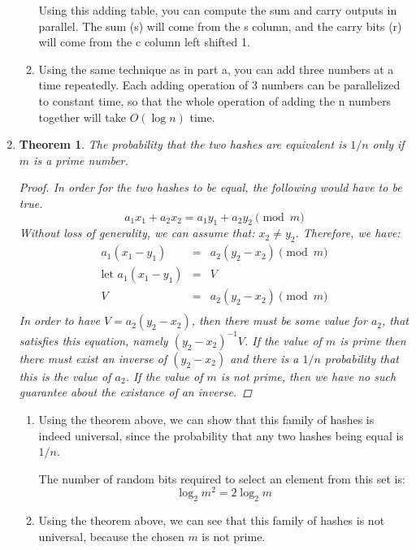 \documentclass[11pt]{article}
\newtheorem{theorem}{Theorem}
\begin{document}
\begin{enumerate}
\begin{enumerate}
Using this adding table, you can compute the sum and carry outputs in parallel. 
The sum (s) will come from the s column, and the carry bits (r) will come from
the c column left shifted 1.
\item
Using the same technique as in part a, you can add three numbers at a time
repeatedly.  Each adding operation of 3 numbers can be parallelized to constant
time, so that the whole operation of adding the n numbers together will take
$O(\log n)$ time. 
\end{enumerate}
\newpage
\item
\begin{theorem}
The probability that the two hashes are equivalent is $1/n$ only if $m$ is a
prime number. 
\begin{proof}
In order for the two hashes to be equal, the following would have to be true. 
\begin{equation*}
a_1x_1 + a_2x_2 = a_1y_1 + a_2y_2 \pmod{m}
\end{equation*}
Without loss of generality, we can assume that: $x_2 \neq y_2$.
Therefore, we have:
\begin{eqnarray*}
a_1(x_1 - y_1) &=&  a_2(y_2 - x_2) \pmod{m}\\
\text{let  } a_1(x_1 - y_1) &=& V\\
V &=& a_2(y_2 - x_2) \pmod{m}\\
\end{eqnarray*}
In order to have $V = a_2(y_2 - x_2)$, then there must be some value for $a_2$,
that satisfies this equation, namely $(y_2 - x_2)^{-1}V$. If the value of $m$
is prime then there must exist an inverse of $(y_2 - x_2)$ and there is a $1/n$
probability that this is the value of $a_2$. If the value of $m$ is not prime,
then we have no such guarantee about the existance of an inverse. 
\end{proof}
\end{theorem}
\begin{enumerate}
\item
Using the theorem above, we can show that this family of hashes is indeed
universal, since the probability that any two hashes being equal is $1/n$.

The number of random bits required to select an element from this set is: 
\begin{equation*}
\log_2 m^2 = 2\log_2 m
\end{equation*}
\item
Using the theorem above, we can see that this family of hashes is not universal,
because the chosen $m$ is not prime. 


\end{enumerate}
\end{enumerate}
\end{document}
